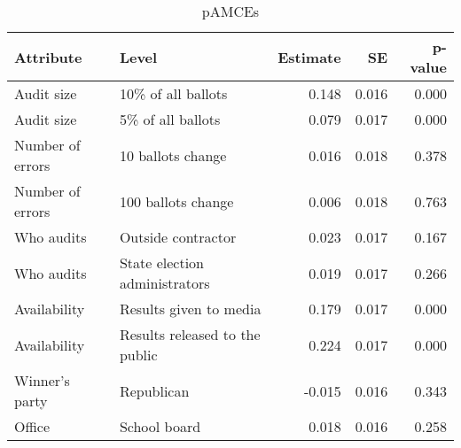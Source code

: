 \begin{table}[!h]

\caption{pAMCEs}
\centering
\begin{tabular}[t]{llrrr}
\toprule
Attribute & Level & Estimate & SE & p-value\\
\midrule
Audit size & 10\% of all ballots & 0.148 & 0.016 & 0.000\\
Audit size & 5\% of all ballots & 0.079 & 0.017 & 0.000\\
Number of errors & 10 ballots change & 0.016 & 0.018 & 0.378\\
Number of errors & 100 ballots change & 0.006 & 0.018 & 0.763\\
Who audits & Outside contractor & 0.023 & 0.017 & 0.167\\
\addlinespace
Who audits & State election administrators & 0.019 & 0.017 & 0.266\\
Availability & Results given to media & 0.179 & 0.017 & 0.000\\
Availability & Results released to the public & 0.224 & 0.017 & 0.000\\
Winner's party & Republican & -0.015 & 0.016 & 0.343\\
Office & School board & 0.018 & 0.016 & 0.258\\
\bottomrule
\end{tabular}
\end{table}
